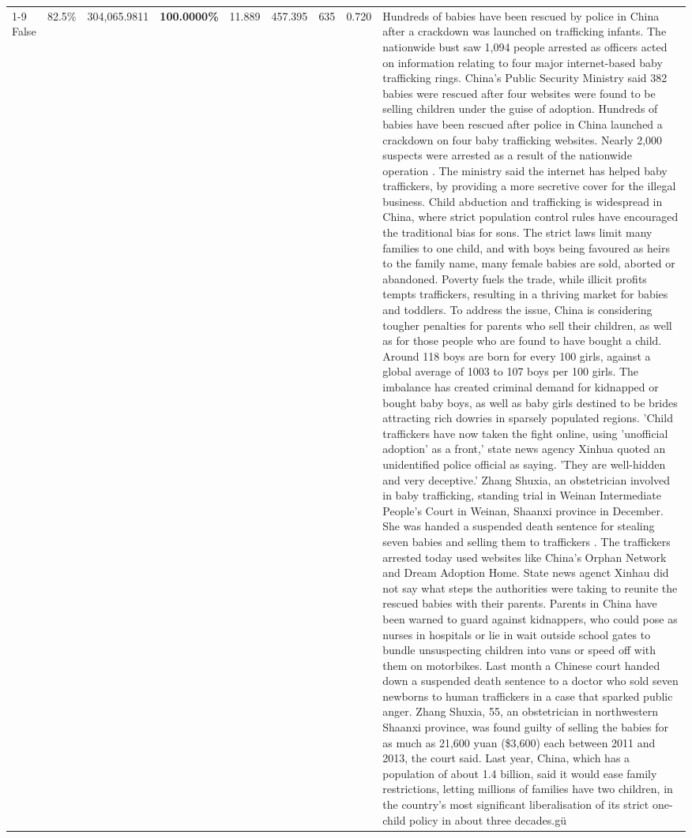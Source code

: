 \begin{table}[H]
\begin{tabular}{lllrlllll}
\cline{1-9}
False & 82.5\% & 304,065.9811 & \bfseries \color{red} 100.0000\% & 11.889 & 457.395 & 635 & 0.720 & Hundreds of babies have been rescued by police in China after a crackdown was launched on trafficking infants. The nationwide bust saw 1,094 people arrested as officers acted on information relating to four major internet-based baby trafficking rings. China's Public Security Ministry said 382 babies were rescued after four websites were found to be selling children under the guise of adoption. Hundreds of babies have been rescued after police in China launched a crackdown on four baby trafficking websites. Nearly 2,000 suspects were arrested as a result of the nationwide operation . The ministry said the internet has helped baby traffickers, by providing a more secretive cover for the illegal business. Child abduction and trafficking is widespread in China, where strict population control rules have encouraged the traditional bias for sons. The strict laws limit many families to one child, and with boys being favoured as heirs to the family name, many female babies are sold, aborted or abandoned. Poverty fuels the trade, while illicit profits tempts traffickers, resulting in a thriving market for babies and toddlers. To address the issue, China is considering tougher penalties for parents who sell their children, as well as for those people who are found to have bought a child. Around 118 boys are born for every 100 girls, against a global average of 1003 to 107 boys per 100 girls. The imbalance has created criminal demand for kidnapped or bought baby boys, as well as baby girls destined to be brides attracting rich dowries in sparsely populated regions. 'Child traffickers have now taken the fight online, using 'unofficial adoption' as a front,' state news agency Xinhua quoted an unidentified police official as saying. 'They are well-hidden and very deceptive.' Zhang Shuxia, an obstetrician involved in baby trafficking, standing trial in Weinan Intermediate People's Court in Weinan, Shaanxi province in December. She was handed a suspended death sentence for stealing seven babies and selling them to traffickers . The traffickers arrested today used websites like China's Orphan Network and Dream Adoption Home. State news agenct Xinhau did not say what steps the authorities were taking to reunite the rescued babies with their parents. Parents in China have been warned to guard against kidnappers, who could pose as nurses in hospitals or lie in wait outside school gates to bundle unsuspecting children into vans or speed off with them on motorbikes. Last month a Chinese court handed down a suspended death sentence to a doctor who sold seven newborns to human traffickers in a case that sparked public anger. Zhang Shuxia, 55, an obstetrician in northwestern Shaanxi province, was found guilty of selling the babies for as much as 21,600 yuan (\$3,600) each between 2011 and 2013, the court said. Last year, China, which has a population of about 1.4 billion, said it would ease family restrictions, letting millions of families have two children, in the country's most significant liberalisation of its strict one-child policy in about three decades.gü \\

\end{tabular}
\end{table}
